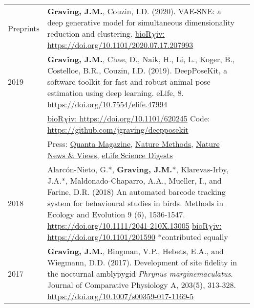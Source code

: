 \documentclass[letterpaper,6pt,oneside]{article}
\begin{document}
\begin{small}
\begin{longtable}{@{} l p{5.3in}l}
\large{Preprints}
& \textbf{Graving, J.M.}, Couzin, I.D. (2020).  VAE-SNE: a deep generative model for simultaneous dimensionality reduction and clustering. \vspace{1mm} \href{https://doi.org/10.1101/2020.07.17.207993}{bioR$\chi$iv: https://doi.org/10.1101/2020.07.17.207993} \\
\large{2019}
 &\textbf{Graving, J.M.}, Chae, D., Naik, H., Li, L., Koger, B., Costelloe, B.R., Couzin, I.D. (2019). DeepPoseKit, a software toolkit for fast and robust animal pose estimation using deep learning. eLife, 8. \href{https://doi.org/10.7554/elife.47994}{https://doi.org/10.7554/elife.47994}\\ &\href{https://doi.org/10.1101/620245}{bioR$\chi$iv: https://doi.org/10.1101/620245} Code: \href{https://github.com/jgraving/deepposekit}{ https://github.com/jgraving/deepposekit} \\
 &Press: \href{https://www.quantamagazine.org/to-decode-the-brain-scientists-automate-the-study-of-behavior-20191210/}{Quanta Magazine}, 
 \href{https://doi.org/10.1038/s41592-019-0678-2}{Nature Methods},
 \href{https://doi.org/10.1038/d41586-019-02942-5}{Nature News \& Views},
 \href{https://elifesciences.org/digests/47994/machine-learning-animal-poses-to-understand-behavior}{eLife Science Digests}
 \vspace{1mm} \\
\large{2018}
& Alarc\'{o}n-Nieto, G.*, \textbf{Graving, J.M.}*, Klarevas-Irby, J.A.*, Maldonado-Chaparro, A.A., Mueller, I., and Farine, D.R. (2018) An automated barcode tracking system for behavioural studies in birds. Methods in Ecology and Evolution 9 (6), 1536-1547. \href{https://doi.org/10.1111/2041-210X.13005}{https://doi.org/10.1111/2041-210X.13005} \href{https://doi.org/10.1101/201590}{bioR$\chi$iv: https://doi.org/10.1101/201590}  \small{*contributed equally}  \vspace{1mm} \\
\large{2017}
& \textbf{Graving, J.M.}, Bingman, V.P., Hebets, E.A., and Wiegmann, D.D. (2017). Development of site fidelity in the nocturnal amblypygid \textit{Phrynus marginemaculatus}. Journal of Comparative Physiology A, 203(5), 313-328. \href{https://doi.org/10.1007/s00359-017-1169-5}{https://doi.org/10.1007/s00359-017-1169-5} \vspace{1mm} \\

\end{longtable}
\end{small}
\end{document}
